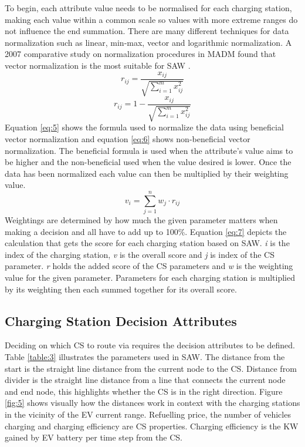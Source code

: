 \documentclass[11pt]{report}
\begin{document}
To begin, each attribute value needs to be normalised for each charging station, making each value within a common scale so values with more extreme ranges do not influence the end summation. There are many different techniques for data normalization such as linear, min-max, vector and logarithmic normalization. A 2007 comparative study on normalization procedures in MADM found that vector normalization is the most suitable for SAW \autocite{chakraborty2007simulation}.
\begin{equation} \label{eq:5}
    r_{ij} = \frac{x_{ij}}{\sqrt{\sum_{i=1}^{m}x_{ij}^{2}}}
\end{equation}
\begin{equation} \label{eq:6}
    r_{ij} = 1 - \frac{x_{ij}}{\sqrt{\sum_{i=1}^{m}x_{ij}^{2}}}
\end{equation}
Equation \ref{eq:5} shows the formula used to normalize the data using beneficial vector normalization and equation \ref{eq:6} shows non-beneficial vector normalization. The beneficial formula is used when the attribute's value aims to be higher and the non-beneficial used when the value desired is lower. Once the data has been normalized each value can then be multiplied by their weighting value. 
\begin{equation} \label{eq:7}
    v_{i}=\sum_{j=1}^{n} w_{j} \cdot r_{ij}
\end{equation}
Weightings are determined by how much the given parameter matters when making a decision and all have to add up to 100\%. Equation \ref{eq:7} depicts the calculation that gets the score for each charging station based on SAW. \emph{i} is the index of the charging station, \emph{v}
is the overall score and \emph{j} is index of the CS parameter. \emph{r} holds the added score of the CS parameters and \emph{w} is the weighting value for the given parameter. Parameters for each charging station is multiplied by its weighting then each summed together for its overall score.

\subsection{Charging Station Decision Attributes}

Deciding on which CS to route via requires the decision attributes to be defined. Table \ref{table:3} illustrates the parameters used in SAW. The distance from the start is the straight line distance from the current node to the CS. Distance from divider is the straight line distance from a line that connects the current node and end node, this highlights whether the CS is in the right direction. Figure \ref{fig:5} shows visually how the distances work in context with the charging stations in the vicinity of the EV current range. Refuelling price, the number of vehicles charging and charging efficiency are CS properties. Charging efficiency is the KW gained by EV battery per time step from the CS.
\end{document}
